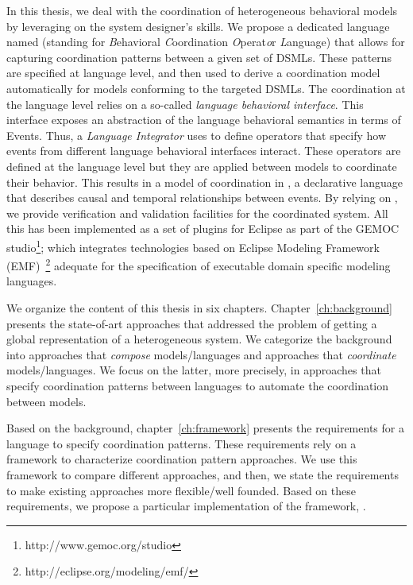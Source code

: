 In this thesis, we deal with the coordination of heterogeneous behavioral models by leveraging on the system designer's skills. We propose a dedicated language named \bcool (standing for \emph{B}ehavioral \emph{C}oordination \emph{O}perat\emph{o}r \emph{L}anguage) that allows for capturing coordination patterns between a given set of DSMLs. These patterns are specified at language level, and then used to derive a coordination model automatically for models conforming to the targeted DSMLs. The coordination at the language level relies on a so-called \emph{language behavioral interface}. This interface exposes an abstraction of the language behavioral semantics in terms of Events. Thus, a \emph{Language Integrator} uses \bcool to define operators that specify how events from different language behavioral interfaces interact. These operators are defined at the language level but they are applied between models to coordinate their behavior. This results in a model of coordination in \ccsl, a declarative language that describes causal and temporal relationships between events. By relying on \ccsl, we provide verification and validation facilities for the coordinated system. All this has been implemented as a set of plugins for Eclipse as part of the GEMOC studio\footnote{http://www.gemoc.org/studio}; which integrates technologies based on Eclipse Modeling Framework (EMF)~\footnote{http://eclipse.org/modeling/emf/} adequate for the specification of executable domain specific modeling languages. %

We organize the content of this thesis in six chapters. Chapter~\ref{ch:background} presents the state-of-art approaches that addressed the problem of getting a global representation of a heterogeneous system. We categorize the background into approaches that \emph{compose} models/languages and approaches that \emph{coordinate} models/languages. We focus on the latter, more precisely, in approaches that specify coordination patterns between languages to automate the coordination between models.  

Based on the background, chapter~\ref{ch:framework} presents the requirements for a language to specify coordination patterns. These requirements rely on a framework to characterize coordination pattern approaches. We use this framework to compare different approaches, and then, we state the requirements to make existing approaches more flexible/well founded. Based on these requirements, we propose a particular implementation of the framework, \ie \bcool. 

